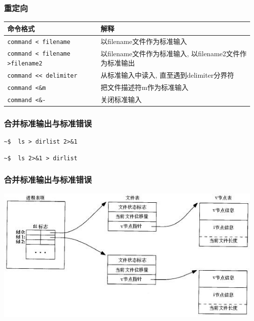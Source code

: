 \documentclass[compress]{beamer}
\begin{document}
\begin{frame}[fragile]
\frametitle{重定向}

{\footnotesize
\begin{tabular}{l p{5cm}}\hline
命令格式 & 解释 \\ \hline

\verb=command < filename= & 以filename文件作为标准输入 \\

\verb=command < filename >filename2= & 以filename文件作为标准输入, 以filename2文件作为标准输出 \\


\verb=command << delimiter= & 从标准输入中读入,
直至遇到delimiter分界符
\\

\verb=command <&m= & 把文件描述符m作为标准输入 \\

\verb=command <&-= & 关闭标准输入 \\ \hline

\end{tabular}}


\end{frame}

\begin{frame}[fragile]
\frametitle{合并标准输出与标准错误}

\begin{Verbatim}
~$  ls > dirlist 2>&1
\end{Verbatim}

\begin{Verbatim}
~$  ls 2>&1 > dirlist
\end{Verbatim}

\end{frame}

\begin{frame}
\frametitle{合并标准输出与标准错误}

\includegraphics[width=\hsize]{vnode.jpg}

\end{frame}
\end{document}

